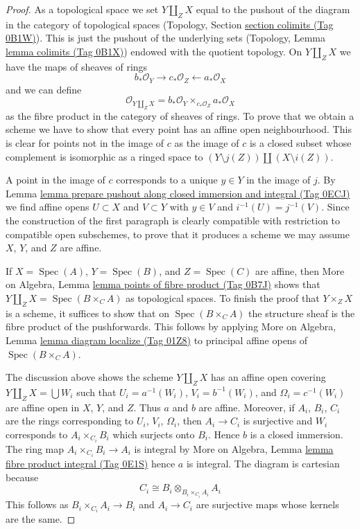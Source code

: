 \documentclass{amsart}
\theoremstyle{plain}
\theoremstyle{definition}
\theoremstyle{remark}
\numberwithin{equation}{subsection}
\def\Spec{\mathop{\mathrm{Spec}}}
\begin{document}
\begin{proof}
As a topological space we set $Y \amalg_Z X$ equal to the pushout of
the diagram in the category of topological spaces (Topology, Section
\href{https://stacks.math.columbia.edu/tag/0B1W}{section colimits (Tag 0B1W)}). This is just the pushout
of the underlying sets (Topology, Lemma \href{https://stacks.math.columbia.edu/tag/0B1X}{lemma colimits (Tag 0B1X)})
endowed with the quotient topology.
On $Y \amalg_Z X$ we have the maps of sheaves of rings
$$
b_*\mathcal{O}_Y \longrightarrow c_*\mathcal{O}_Z
\longleftarrow a_*\mathcal{O}_X
$$
and we can define
$$
\mathcal{O}_{Y \amalg_Z X} =
b_*\mathcal{O}_Y \times_{c_*\mathcal{O}_Z} a_*\mathcal{O}_X
$$
as the fibre product in the category of sheaves of rings. To prove that we
obtain a scheme we have to show that every point has an
affine open neighbourhood. This is clear for points not in the image of $c$
as the image of $c$ is a closed subset whose complement is
isomorphic as a ringed space to $(Y \setminus j(Z)) \amalg (X \setminus i(Z))$.

\medskip\noindent
A point in the image of $c$ corresponds to a unique $y \in Y$
in the image of $j$. By
Lemma \href{https://stacks.math.columbia.edu/tag/0ECJ}{lemma prepare pushout along closed immersion and integral (Tag 0ECJ)}
we find affine opens $U \subset X$ and $V \subset Y$ with
$y \in V$ and $i^{-1}(U) = j^{-1}(V)$.
Since the construction of the first paragraph is clearly compatible
with restriction to compatible open subschemes, to prove that it
produces a scheme we may assume $X$, $Y$, and $Z$ are affine.

\medskip\noindent
If $X = \Spec(A)$, $Y = \Spec(B)$, and $Z = \Spec(C)$ are affine, then
More on Algebra, Lemma \href{https://stacks.math.columbia.edu/tag/0B7J}{lemma points of fibre product (Tag 0B7J)}
shows that $Y \amalg_Z X = \Spec(B \times_C A)$ as topological spaces.
To finish the proof that $Y \times_Z X$ is a scheme, it suffices to show
that on $\Spec(B \times_C A)$ the structure sheaf is the fibre product
of the pushforwards. This follows by applying
More on Algebra, Lemma \href{https://stacks.math.columbia.edu/tag/01Z8}{lemma diagram localize (Tag 01Z8)}
to principal affine opens of $\Spec(B \times_C A)$.

\medskip\noindent
The discussion above shows the scheme $Y \amalg_Z X$
has an affine open covering $Y \amalg_Z X = \bigcup W_i$
such that $U_i = a^{-1}(W_i)$, $V_i = b^{-1}(W_i)$, and
$\Omega_i = c^{-1}(W_i)$ are affine open in $X$, $Y$, and $Z$.
Thus $a$ and $b$ are affine.
Moreover, if $A_i$, $B_i$, $C_i$ are the rings corresponding to
$U_i$, $V_i$, $\Omega_i$, then $A_i \to C_i$ is surjective and
$W_i$ corresponds to $A_i \times_{C_i} B_i$ which surjects onto
$B_i$. Hence $b$ is a closed immersion.
The ring map $A_i \times_{C_i} B_i \to A_i$ is integral by
More on Algebra, Lemma \href{https://stacks.math.columbia.edu/tag/0E1S}{lemma fibre product integral (Tag 0E1S)}
hence $a$ is integral. The diagram is cartesian because
$$
C_i \cong B_i \otimes_{B_i \times_{C_i} A_i} A_i
$$
This follows as $B_i \times_{C_i} A_i \to B_i$
and $A_i \to C_i$ are surjective maps whose kernels are the same.


\end{proof}
\end{document}
